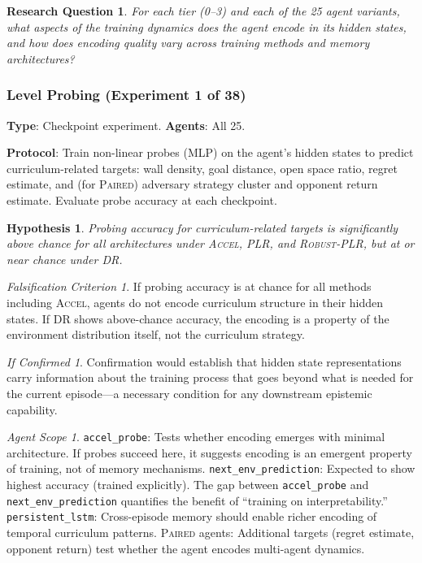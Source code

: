 \documentclass[11pt,a4paper]{article}
\newtheorem{hypothesis}{Hypothesis}[subsection]
\newtheorem{researchq}{Research Question}[subsection]
\theoremstyle{remark}
\newtheorem*{falsification}{Falsification Criterion}
\newtheorem*{implication}{If Confirmed}
\newtheorem*{agentscope}{Agent Scope}
\newcommand{\paired}{\textsc{Paired}}
\newcommand{\accel}{\textsc{Accel}}
\newcommand{\plr}{\textsc{PLR}}
\newcommand{\dr}{\textsc{DR}}
\newcommand{\rplr}{\textsc{Robust-PLR}}
\begin{document}
\begin{researchq}
For each tier (0--3) and each of the 25 agent variants, what aspects of the training dynamics does the agent encode in its hidden states, and how does encoding quality vary across training methods and memory architectures?
\end{researchq}

\subsubsection{Level Probing (Experiment 1 of 38)}
\label{exp:level_probing}

\textbf{Type}: Checkpoint experiment. \textbf{Agents}: All 25.

\textbf{Protocol}: Train non-linear probes (MLP) on the agent's hidden states to predict curriculum-related targets: wall density, goal distance, open space ratio, regret estimate, and (for \paired{}) adversary strategy cluster and opponent return estimate. Evaluate probe accuracy at each checkpoint.

\begin{hypothesis}
Probing accuracy for curriculum-related targets is significantly above chance for all architectures under \accel{}, \plr{}, and \rplr{}, but at or near chance under \dr{}.
\end{hypothesis}

\begin{falsification}
If probing accuracy is at chance for all methods including \accel{}, agents do not encode curriculum structure in their hidden states. If \dr{} shows above-chance accuracy, the encoding is a property of the environment distribution itself, not the curriculum strategy.
\end{falsification}

\begin{implication}
Confirmation would establish that hidden state representations carry information about the training process that goes beyond what is needed for the current episode---a necessary condition for any downstream epistemic capability.
\end{implication}

\begin{agentscope}
\texttt{accel\_probe}: Tests whether encoding emerges with minimal architecture. If probes succeed here, it suggests encoding is an emergent property of training, not of memory mechanisms. \texttt{next\_env\_prediction}: Expected to show highest accuracy (trained explicitly). The gap between \texttt{accel\_probe} and \texttt{next\_env\_prediction} quantifies the benefit of ``training on interpretability.'' \texttt{persistent\_lstm}: Cross-episode memory should enable richer encoding of temporal curriculum patterns. \paired{} agents: Additional targets (regret estimate, opponent return) test whether the agent encodes multi-agent dynamics.
\end{agentscope}
\end{document}
